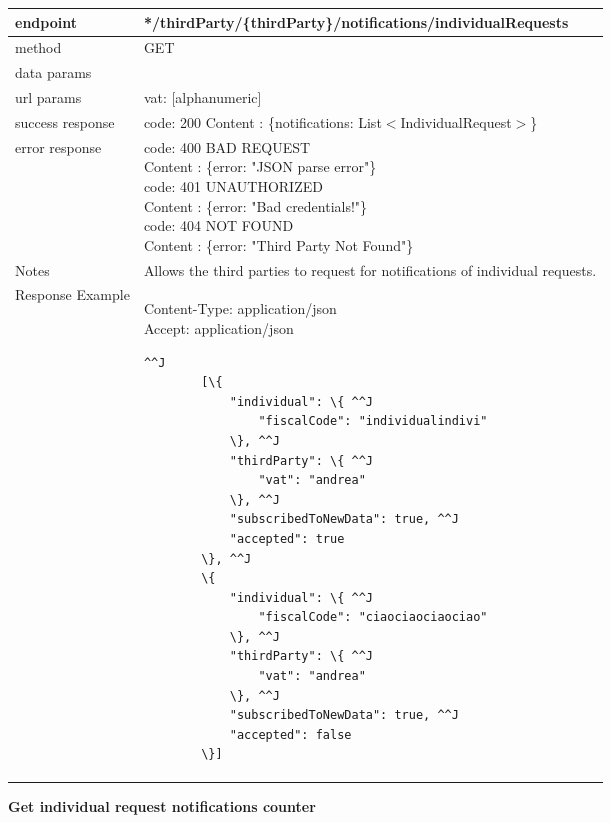	\begin{tabularx}{\linewidth}{| l| l }
		\hline
		endpoint & */thirdParty/\{thirdParty\}/notifications/individualRequests \\
		\hline
		method & GET \\
		\hline
		data params & \\
		\hline
		url params &
		\parbox{0.7\textwidth}{
			\bigskip
			vat: [alphanumeric]
			\bigskip
		} \\
		\hline
		success response &
		\parbox{0.7\textwidth}{
			\bigskip
			code: 200\\
			Content : \{notifications: List$<$IndividualRequest$>$\}
			\bigskip
		} \\
		\hline
		error response &
		\parbox{0.7\textwidth}{
			\bigskip
			code: 400 BAD REQUEST \\
			Content : \{error: "JSON parse error"\}\\
			code: 401 UNAUTHORIZED \\
			Content : \{error: "Bad credentials!"\}\\
			code: 404 NOT FOUND \\
			Content : \{error: "Third Party Not Found"\}
			\bigskip
		} \\
		\hline
		Notes & 
		\parbox{0.7\textwidth}{
			\bigskip Allows the third parties to request for notifications of individual requests.
		\bigskip}  \\
		\hline
		Response Example & 
		\parbox{0.8\textwidth}{
		\bigskip
		Content-Type: application/json \\
		Accept: application/json \\
		\bigskip
		\begin{lstlisting}^^J
		[\{
			"individual": \{ ^^J
				"fiscalCode": "individualindivi"
			\}, ^^J
			"thirdParty": \{ ^^J
				"vat": "andrea"
			\}, ^^J
			"subscribedToNewData": true, ^^J
			"accepted": true
		\}, ^^J
		\{
			"individual": \{ ^^J
				"fiscalCode": "ciaociaociaociao"
			\}, ^^J
			"thirdParty": \{ ^^J
				"vat": "andrea"
			\}, ^^J
			"subscribedToNewData": true, ^^J
			"accepted": false
		\}]
	\end{lstlisting}
	} \\
	\hline
	\end{tabularx}
	
	\textbf{Get individual request notifications counter} \\

